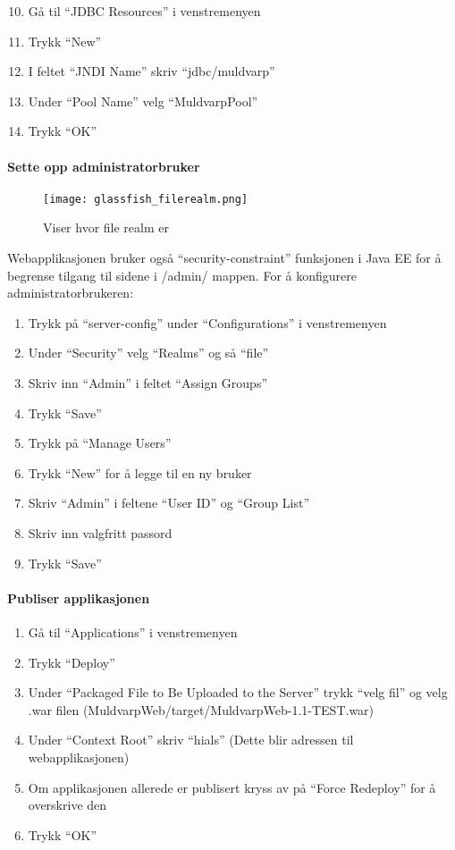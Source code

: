 \documentclass[../main.tex]{subfiles}
\begin{document}
\begin{enumerate}
\setcounter{enumi}{9}
\item Gå til “JDBC Resources” i venstremenyen
\item Trykk “New”
\item I feltet “JNDI Name” skriv “jdbc/muldvarp”
\item Under “Pool Name” velg “MuldvarpPool”
\item Trykk “OK”
\end{enumerate}

\paragraph{Sette opp administratorbruker}

\begin{wrapfigure}{l}{4cm}
  \begin{center}
    \texttt{[image: glassfish\_filerealm.png]}
  \end{center}
  \caption{Viser hvor file realm er}
\end{wrapfigure}

Webapplikasjonen bruker også “security-constraint” funksjonen i Java EE for å begrense tilgang til sidene i /admin/ mappen. \newline
\newline
For å konfigurere administratorbrukeren:
\begin{enumerate}
\item Trykk på “server-config” under “Configurations” i venstremenyen
\item Under “Security” velg “Realms” og så “file”
\item Skriv inn “Admin” i feltet “Assign Groups”
\item Trykk “Save”
\item Trykk på “Manage Users”
\item Trykk “New” for å legge til en ny bruker
\item Skriv “Admin” i feltene “User ID” og “Group List”
\item Skriv inn valgfritt passord
\item Trykk “Save”
\end{enumerate}

\paragraph{Publiser applikasjonen}
\begin{enumerate}
\item Gå til “Applications” i venstremenyen
\item Trykk “Deploy”
\item Under “Packaged File to Be Uploaded to the Server” trykk “velg fil” og velg .war filen (MuldvarpWeb/target/MuldvarpWeb-1.1-TEST.war)
\item Under “Context Root” skriv “hials” (Dette blir adressen til webapplikasjonen)
\item Om applikasjonen allerede er publisert kryss av på “Force Redeploy” for å overskrive den
\item Trykk “OK”
\end{enumerate}
\end{document}
